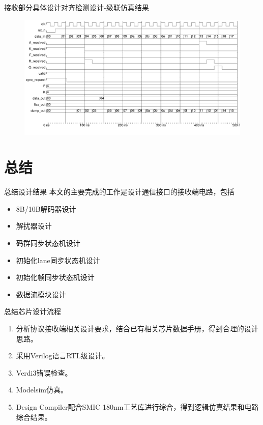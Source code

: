 \documentclass{beamer}
\begin{document}
\begin{frame}{接收部分具体设计}{对齐检测设计-级联仿真结果}
  \begin{figure}
  \includegraphics[scale=0.35]{./img/recv_top_wave.pdf}
  \end{figure}
\end{frame}

\section{总结}

\begin{frame}{总结}{设计结果}
	本文的主要完成的工作是设计通信接口的接收端电路，包括
	\begin{itemize}
	\item 8B/10B解码器设计
	\item 解扰器设计
	\item 码群同步状态机设计
	\item 初始化lane同步状态机设计
	\item 初始化帧同步状态机设计
  \item 数据流模块设计
	\end{itemize}
\end{frame}

\begin{frame}{总结}{芯片设计流程}
	\begin{enumerate}
	\item 分析协议接收端相关设计要求，结合已有相关芯片数据手册，得到合理的设计思路。
  \item 采用Verilog语言RTL级设计。
	\item Verdi3错误检查。
	\item Modelsim仿真。
	\item Design Compiler配合SMIC 180nm工艺库进行综合，得到逻辑仿真结果和电路综合结果。
  \end{enumerate}
\end{frame}
\end{document}
